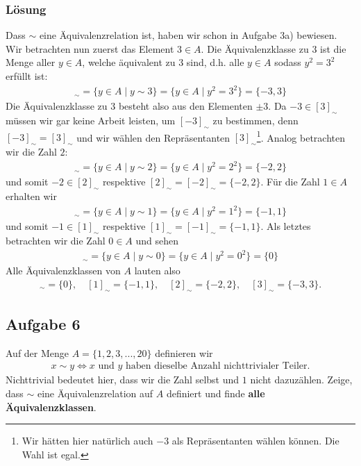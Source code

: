 \documentclass[a4paper,10pt]{article}
\newcommand{\s}[1]{#1}
\begin{document}
\s{\subsubsection*{Lösung}
Dass $\sim$ eine Äquivalenzrelation ist, haben wir schon in Aufgabe 3a) bewiesen. Wir betrachten nun zuerst das Element $3\in A$. Die Äquivalenzklasse zu $3$ ist die Menge aller $y\in A$, welche äquivalent zu $3$ sind, d.h. alle $y\in A$ sodass $y^2=3^2$ erfüllt ist:
\begin{align*}
    [3]_\sim = \{y\in A\mid y\sim 3\}=\{y\in A\mid y^2=3^2\} = \{-3,3\}
\end{align*}
Die Äquivalenzklasse zu $3$ besteht also aus den Elementen $\pm 3$. Da $-3\in [3]_\sim$ müssen wir gar keine Arbeit leisten, um $[-3]_\sim$ zu bestimmen, denn $[-3]_\sim=[3]_\sim$ und wir wählen den Repräsentanten $[3]_\sim$\footnote{Wir hätten hier natürlich auch $-3$ als Repräsentanten wählen können. Die Wahl ist egal.}. Analog betrachten wir die Zahl $2$:
\begin{align*}
    [2]_\sim = \{y\in A\mid y\sim 2\}=\{y\in A\mid y^2=2^2\} = \{-2,2\}
\end{align*}
und somit $-2\in [2]_\sim$ respektive $[2]_\sim=[-2]_\sim=\{-2,2\}$. Für die Zahl $1\in A$ erhalten wir
\begin{align*}
    [1]_\sim = \{y\in A\mid y\sim 1\}=\{y\in A\mid y^2=1^2\} = \{-1,1\}
\end{align*}
und somit $-1\in [1]_\sim$ respektive $[1]_\sim=[-1]_\sim=\{-1,1\}$. Als letztes betrachten wir die Zahl $0\in A$ und sehen
\begin{align*}
    [0]_\sim = \{y\in A\mid y\sim 0\}=\{y\in A\mid y^2=0^2\} = \{0\}
\end{align*}
Alle Äquivalenzklassen von $A$ lauten also
\begin{align*}
    [0]_\sim = \{0\},\quad [1]_\sim = \{-1,1\},\quad [2]_\sim = \{-2,2\},\quad [3]_\sim = \{-3,3\}.
\end{align*}
}
\subsection*{Aufgabe 6}
Auf der Menge $A=\{1,2,3,...,20\}$ definieren wir
\begin{align*}
    x\sim y \iff x \text{ und }y\text{ haben dieselbe Anzahl nichttrivialer Teiler.}
\end{align*}
Nichttrivial bedeutet hier, dass wir die Zahl selbst und $1$ nicht dazuzählen. Zeige, dass $\sim$ eine Äquivalenzrelation auf $A$ definiert und finde \textbf{alle Äquivalenzklassen}.
\end{document}
